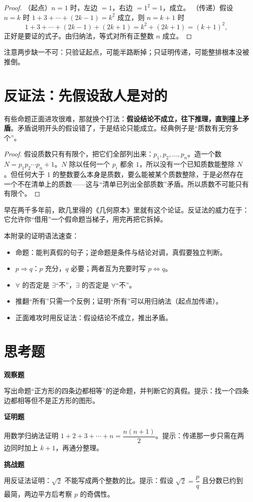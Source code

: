 \begin{proof}
（起点）$n=1$ 时，左边 $=1$，右边 $=1^2=1$，成立。
（传递）假设 $n=k$ 时 $1+3+\cdots+(2k-1)=k^2$ 成立，则 $n=k+1$ 时
\[1+3+\cdots+(2k-1)+(2k+1)=k^2+(2k+1)=(k+1)^2,\]
正好是要证的式子。由归纳法，等式对所有正整数 $n$ 成立。
\end{proof}

注意两步缺一不可：只验证起点，可能半路断掉；只证明传递，可能整排根本没被推倒。

\section{反证法：先假设敌人是对的}

有些命题正面进攻很难，那就换个打法：\textbf{假设结论不成立，往下推理，直到撞上矛盾}。矛盾说明开头的假设错了，于是结论只能成立。经典例子是“质数有无穷多个”。

\begin{proof}
假设质数只有有限个，把它们全部列出来：$p_1,p_2,\dots,p_n$。造一个数 $N=p_1p_2\cdots p_n+1$。$N$ 除以任何一个 $p_i$ 都余 $1$，所以没有一个已知质数能整除 $N$。但任何大于 $1$ 的整数要么本身是质数，要么能被某个质数整除，于是必然存在一个不在清单上的质数——这与“清单已列出全部质数”矛盾。所以质数不可能只有有限个。
\end{proof}

早在两千多年前，欧几里得的《几何原本》里就有这个论证。反证法的威力在于：它允许你“借用”一个假命题当梯子，用完再把它拆掉。

\begin{toolbox}
本附录的证明语法速查：
\begin{itemize}
\item 命题：能判真假的句子；逆命题是条件与结论对调，真假要独立判断。
\item $p\Rightarrow q$：$p$ 充分，$q$ 必要；两者互为充要时写 $p\Leftrightarrow q$。
\item $\forall$ 的否定是 $\exists$“不”，$\exists$ 的否定是 $\forall$“不”。
\item 推翻“所有”只需一个反例；证明“所有”可以用归纳法（起点加传递）。
\item 正面难攻时用反证法：假设结论不成立，推出矛盾。
\end{itemize}
\end{toolbox}

\section*{思考题}

\textbf{观察题}
\begin{sikao}
\item 写出命题“正方形的四条边都相等”的逆命题，并判断它的真假。提示：找一个四条边都相等但不是正方形的图形。
\end{sikao}

\textbf{证明题}
\begin{sikao}
\item 用数学归纳法证明 $1+2+3+\cdots+n=\dfrac{n(n+1)}{2}$。提示：传递那一步只需在两边同时加上 $k+1$，再通分整理。
\end{sikao}

\textbf{挑战题}
\begin{sikao}
\item 用反证法证明：$\sqrt{2}$ 不能写成两个整数的比。提示：假设 $\sqrt{2}=\dfrac{p}{q}$ 且分数已约到最简，两边平方后考察 $p$ 的奇偶性。
\end{sikao}
